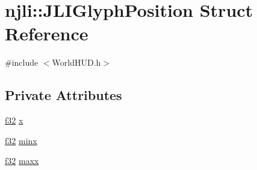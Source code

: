 \hypertarget{structnjli_1_1_j_l_i_glyph_position}{}\section{njli\+:\+:J\+L\+I\+Glyph\+Position Struct Reference}
\label{structnjli_1_1_j_l_i_glyph_position}


{\ttfamily \#include $<$World\+H\+U\+D.\+h$>$}

\subsection*{Private Attributes}
\begin{DoxyCompactItemize}
\item 
\mbox{\hyperlink{_util_8h_a5f6906312a689f27d70e9d086649d3fd}{f32}} \mbox{\hyperlink{structnjli_1_1_j_l_i_glyph_position_a6ed30622b40cf678e609e334d92696e9}{x}}
\item 
\mbox{\hyperlink{_util_8h_a5f6906312a689f27d70e9d086649d3fd}{f32}} \mbox{\hyperlink{structnjli_1_1_j_l_i_glyph_position_ae033f5c40cd80581c9b4ea0ef7a50212}{minx}}
\item 
\mbox{\hyperlink{_util_8h_a5f6906312a689f27d70e9d086649d3fd}{f32}} \mbox{\hyperlink{structnjli_1_1_j_l_i_glyph_position_a7186124c79d3019feb5b1ed6b0408302}{maxx}}
\end{DoxyCompactItemize}
